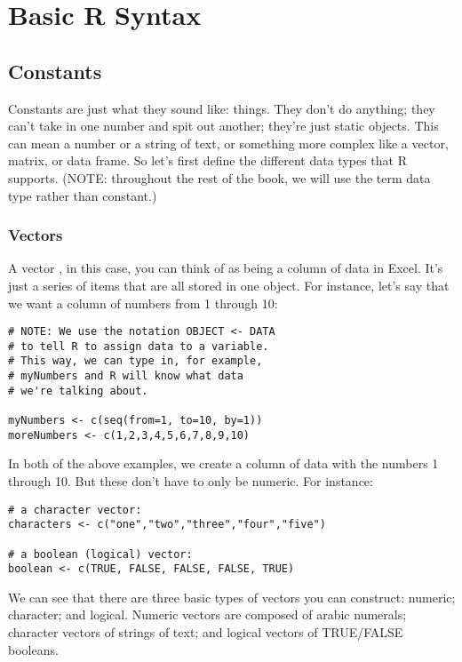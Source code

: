 \section{Basic R Syntax} 

\subsection{Constants}
Constants are just what they sound like: things. They don't do anything; they can't take in one number and spit out another; they're just static objects. This can mean a number or a string of text, or something more complex like a vector, matrix, or data frame. So let's first define the different data types that R supports. (NOTE: throughout the rest of the book, we will use the term data type rather than constant.)

\subsubsection{Vectors}
A vector , in this case, you can think of as being a column of data in Excel. It's just a series of items that are all stored in one object. For instance, let's say that we want a column of numbers from 1 through 10:

\begin{framed}
\begin{Verbatim}[samepage=TRUE]
# NOTE: We use the notation OBJECT <- DATA
# to tell R to assign data to a variable.
# This way, we can type in, for example,
# myNumbers and R will know what data
# we're talking about.

myNumbers <- c(seq(from=1, to=10, by=1))
moreNumbers <- c(1,2,3,4,5,6,7,8,9,10)
\end{Verbatim}
\end{framed}

In both of the above examples, we create a column of data with the numbers 1 through 10. But these don't have to only be numeric. For instance:

\begin{framed}
\begin{Verbatim}[samepage=TRUE]
# a character vector:
characters <- c("one","two","three","four","five")

# a boolean (logical) vector:
boolean <- c(TRUE, FALSE, FALSE, FALSE, TRUE)
\end{Verbatim}
\end{framed}

We can see that there are three basic types of vectors you can construct: numeric; character; and logical. Numeric vectors are composed of arabic numerals; character vectors of strings of text; and logical vectors of TRUE/FALSE booleans.

